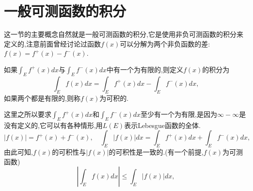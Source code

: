 \documentclass[12pt,a4paper,openany]{book}
\begin{document}
\section{一般可测函数的积分}
这一节的主要概念自然就是一般可测函数的积分,它是使用非负可测函数的积分来定义的,注意前面曾经讨论过函数$f(x)$可以分解为两个非负函数的差:$f(x)=f^+(x)-f^-(x)$.

如果$\int_{E}{f^+(x)dx}$与$\int_{E}{f^-(x)dx}$中有一个为有限的,则定义$f(x)$的积分为
\[
\int_{E}{f(x)dx} = \int_{E}{f^+(x)dx} - \int_{E}{f^-(x)dx},
\]
如果两个都是有限的,则称$f(x)$为可积的.

这里之所以要求$\int_{E}{f^+(x)dx}$和$\int_{E}{f^-(x)dx}$至少有一个为有限,是因为$\infty-\infty$是没有定义的,它可以有各种情形,用$L(E)$表示Lebesgue函数的全体.
\[
|f(x)|=f^+(x)+f^-(x), \quad \int_{E}{|f(x)|dx} = \int_{E}{f^+(x)dx} + \int_{E}{f^-(x)dx},
\]
由此可知,$f(x)$的可积性与$|f(x)|$的可积性是一致的.(有一个前提,$f(x)$为可测函数)
\[
|\int_{E}{f(x)dx}| \le \int_{E}{|f(x)|dx},
\]
\end{document}
